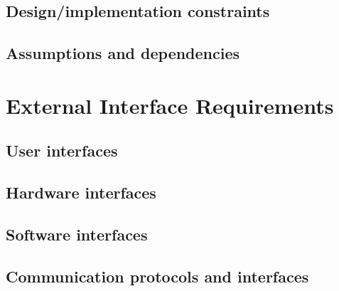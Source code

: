 \documentclass[10pt]{article}
\begin{document}
\subsection{Design/implementation constraints}

\lipsum[10]

\subsection{Assumptions and dependencies}

\lipsum[10]








\section{External Interface Requirements} 

\subsection{User interfaces}

\lipsum[10]

\subsection{Hardware interfaces}

\lipsum[10]

\subsection{Software interfaces}

\lipsum[10]

\subsection{Communication protocols and interfaces}

\lipsum[10]




\end{document}
